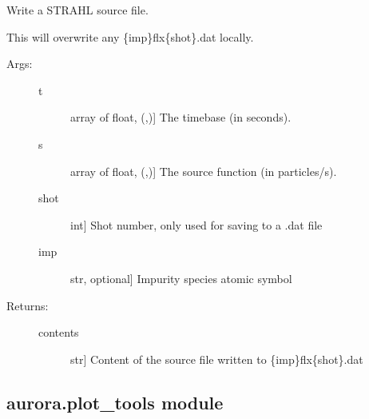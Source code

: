 \documentclass[letterpaper,10pt,english]{sphinxmanual}
\begin{document}
\begin{fulllineitems}
\label{\detokenize{aurora:aurora.source_utils.write_source}}
Write a STRAHL source file.

This will overwrite any \{imp\}flx\{shot\}.dat locally.
\begin{description}
\item[{Args:}] \leavevmode\begin{description}
\item[{t}] \leavevmode{[}array of float, (,){]}
The timebase (in seconds).

\item[{s}] \leavevmode{[}array of float, (,){]}
The source function (in particles/s).

\item[{shot}] \leavevmode{[}int{]}
Shot number, only used for saving to a .dat file

\item[{imp}] \leavevmode{[}str, optional{]}
Impurity species atomic symbol

\end{description}

\item[{Returns:}] \leavevmode\begin{description}
\item[{contents}] \leavevmode{[}str{]}
Content of the source file written to \{imp\}flx\{shot\}.dat

\end{description}

\end{description}

\end{fulllineitems}



\subsection{aurora.plot\_tools module}
\label{\detokenize{aurora:module-aurora.plot_tools}}\label{\detokenize{aurora:aurora-plot-tools-module}}
\end{document}
